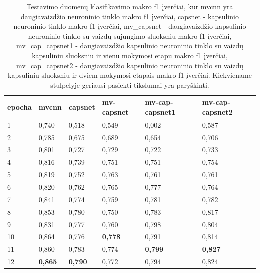 \begin{table}[]
	\caption{
		Testavimo duomenų klasifikavimo makro f1 įverčiai, kur mvcnn yra daugiavaizdžio neuroninio tinklo makro f1 įverčiai, capsnet - kapsulinio neuroninio tinklo makro f1 įverčiai, mv\_capsnet - daugiavaizdžio kapsulinio neuroninio tinklo su vaizdų sujungimo sluoksniu makro f1 įverčiai, mv\_cap\_capsnet1 - daugiavaizdžio kapsulinio neuroninio tinklo su vaizdų kapsuliniu sluoksniu ir vienu mokymosi etapu makro f1 įverčiai, mv\_cap\_capsnet2 - daugiavaizdžio kapsulinio neuroninio tinklo su vaizdų kapsuliniu sluoksniu ir dviem mokymosi etapais makro f1 įverčiai. Kiekviename stulpelyje geriausi pasiekti tikslumai yra paryškinti.
	}
	\begin{tabular}{l|l|l|l|l|l}
		epocha & mvcnn & capsnet & mv-capsnet & mv-cap-capsnet1 & mv-cap-capsnet2 \\
		\hline
		1 & 0,740 &   0,518 &      0,549 &           0,002 &           0,587 \\
		2 & 0,785 &   0,675 &      0,689 &           0,654 &           0,706 \\
		3 & 0,801 &   0,727 &      0,729 &           0,722 &           0,733 \\
		4 & 0,816 &   0,739 &      0,751 &           0,751 &           0,754 \\
		5 & 0,819 &   0,752 &      0,763 &           0,761 &           0,761 \\
		6 & 0,820 &   0,762 &      0,765 &           0,777 &           0,764 \\
		7 & 0,841 &   0,774 &      0,759 &           0,781 &           0,782 \\
		8 & 0,853 &   0,780 &      0,750 &           0,783 &           0,817 \\
		9 & 0,831 &   0,777 &      0,760 &           0,798 &           0,804 \\
		10 & 0,864 &   0,776 &      \textbf{0,778} &           0,791 &           0,814 \\
		11 & 0,860 &   0,783 &      0,774 &           \textbf{0,799} &           \textbf{0,827} \\
		12 & \textbf{0,865} &   \textbf{0,790} &      0,772 &           0,794 &           0,824 \\
	\end{tabular}
	\label{tbl:macro_f1}
\end{table}


